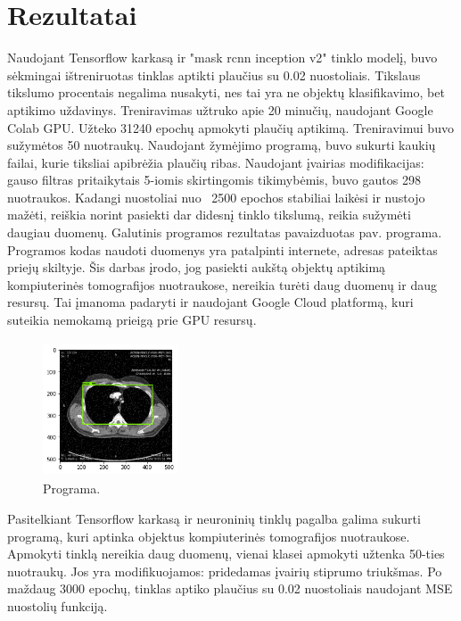 \documentclass{VUMIFInfKursinis}
\begin{document}
\section{Rezultatai}
\par
Naudojant Tensorflow karkasą ir "mask rcnn inception v2" tinklo modelį, buvo sėkmingai
ištreniruotas tinklas aptikti plaučius su 0.02 nuostoliais.
Tikslaus tikslumo procentais negalima nusakyti, nes tai yra ne objektų klasifikavimo,
bet aptikimo uždavinys.
Treniravimas užtruko apie 20 minučių,
naudojant Google Colab GPU. Užteko 31240 epochų apmokyti plaučių aptikimą.
Treniravimui buvo sužymėtos 50 nuotraukų. Naudojant žymėjimo programą, buvo sukurti kaukių
failai, kurie tiksliai apibrėžia plaučių ribas. Naudojant įvairias modifikacijas:
gauso filtras pritaikytais 5-iomis skirtingomis tikimybėmis, buvo gautos 298 nuotraukos.
Kadangi nuostoliai nuo ~2500 epochos stabiliai laikėsi ir nustojo mažėti, reiškia norint
pasiekti dar didesnį tinklo tikslumą, reikia sužymėti daugiau duomenų.
Galutinis programos rezultatas pavaizduotas pav. programa. Programos kodas naudoti
duomenys yra patalpinti internete, adresas pateiktas priejų skiltyje.
Šis darbas įrodo, jog pasiekti aukštą
objektų aptikimą kompiuterinės tomografijos nuotraukose, nereikia turėti daug duomenų ir daug
resursų. Tai įmanoma padaryti ir naudojant Google Cloud platformą, kuri suteikia
nemokamą prieigą prie GPU resursų.


\begin{figure}[ht]
  \centering
  \includegraphics[width=4cm,height=4cm,keepaspectratio]{result1.png}
  \caption{Programa.}
  \label{fig:kaukė1}
\end{figure}

\par
Pasitelkiant Tensorflow karkasą ir neuroninių tinklų pagalba galima sukurti programą,
kuri aptinka objektus kompiuterinės tomografijos nuotraukose. Apmokyti tinklą
nereikia daug duomenų, vienai klasei apmokyti užtenka 50-ties nuotraukų.
Jos yra modifikuojamos: pridedamas įvairių stiprumo triukšmas. Po maždaug 3000 epochų,
tinklas aptiko plaučius su 0.02 nuostoliais naudojant MSE nuostolių funkciją.


\printbibliography[heading=bibintoc] %
\end{document}
